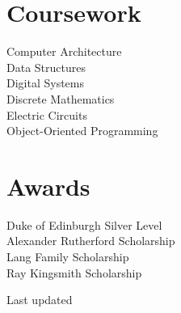 \documentclass[]{hieudo-build}
\begin{document}
\begin{minipage}[t]{0.34\textwidth}
\sectionsep



\section{Coursework}
Computer Architecture \\
Data Structures \\
Digital Systems \\
Discrete Mathematics \\
Electric Circuits \\
Object-Oriented Programming\\
\sectionsep

\section{Awards}
Duke of Edinburgh Silver Level\\
Alexander Rutherford Scholarship \\
Lang Family Scholarship \\
Ray Kingsmith Scholarship \\
\sectionsep

\sectionsep
{}
Last updated 

%
%
\end{minipage} 
\hfill
\end{document}
